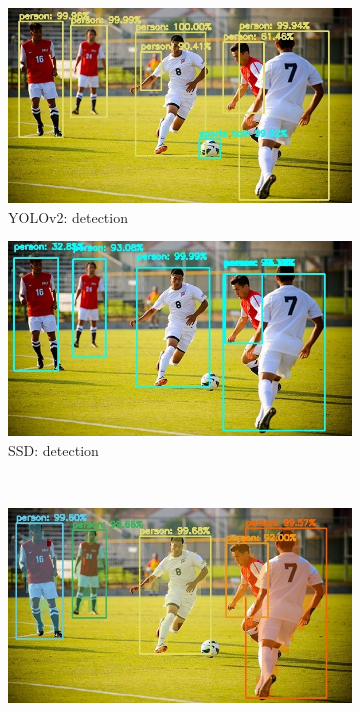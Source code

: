 \begin{figure}[!h]
	\centering
	\begin{subfigure}{.48\linewidth}
		\includegraphics[width=\linewidth]{images/detection/ex3_yolo}
		\caption{YOLOv2: detection}
	\end{subfigure}
	\hspace{0.01\linewidth}
	\begin{subfigure}{.48\linewidth}
		\includegraphics[width=\linewidth]{images/detection/ex3_ssd}
		\caption{SSD: detection}
	\end{subfigure}
	\\
	\begin{subfigure}{.48\linewidth}
		\includegraphics[width=\linewidth]{images/detection/ex3_mask-rcnn}

\end{subfigure}
\end{figure}
